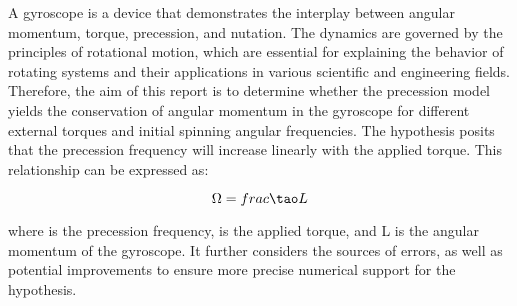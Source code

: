 A gyroscope is a device that demonstrates the interplay between angular momentum, torque, precession, and nutation. The dynamics are governed by the principles of rotational motion, which are essential for explaining the behavior of rotating systems and their applications in various scientific and engineering fields. Therefore, the aim of this report is to determine whether the precession model yields the conservation of angular momentum in the gyroscope for different external torques and initial spinning angular frequencies. The hypothesis posits that the precession frequency will increase linearly with the applied torque. This relationship can be expressed as:

\begin{equation*}
    \Omega = frac{\tao}{L}
\end{equation*}

where  is the precession frequency,  is the applied torque, and L is the angular momentum of the gyroscope. It further considers the sources of errors, as well as potential improvements to ensure more precise numerical support for the hypothesis.
